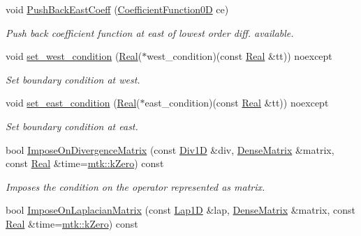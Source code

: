 \begin{DoxyCompactItemize}
void \hyperlink{classmtk_1_1RobinBCDescriptor1D_a7791c11e0950656cb5608a77918c28d4}{Push\+Back\+East\+Coeff} (\hyperlink{group__c07-mim__ops_ga04276745b4d511f0f3c636d6e0df7c2d}{Coefficient\+Function0\+D} ce)
\begin{DoxyCompactList}\small\item\em Push back coefficient function at east of lowest order diff. available. \end{DoxyCompactList}\item 
void \hyperlink{classmtk_1_1RobinBCDescriptor1D_a06bfaf0126d528247c3c76fdd19f4b85}{set\+\_\+west\+\_\+condition} (\hyperlink{group__c01-roots_gac080bbbf5cbb5502c9f00405f894857d}{Real}($\ast$west\+\_\+condition)(const \hyperlink{group__c01-roots_gac080bbbf5cbb5502c9f00405f894857d}{Real} \&tt)) noexcept
\begin{DoxyCompactList}\small\item\em Set boundary condition at west. \end{DoxyCompactList}\item 
void \hyperlink{classmtk_1_1RobinBCDescriptor1D_a4edc92eeaaaa3f1e7f2cedfea3d35681}{set\+\_\+east\+\_\+condition} (\hyperlink{group__c01-roots_gac080bbbf5cbb5502c9f00405f894857d}{Real}($\ast$east\+\_\+condition)(const \hyperlink{group__c01-roots_gac080bbbf5cbb5502c9f00405f894857d}{Real} \&tt)) noexcept
\begin{DoxyCompactList}\small\item\em Set boundary condition at east. \end{DoxyCompactList}\item 
bool \hyperlink{classmtk_1_1RobinBCDescriptor1D_a09b026a79dde6e8dc14e981a45320863}{Impose\+On\+Divergence\+Matrix} (const \hyperlink{classmtk_1_1Div1D}{Div1\+D} \&div, \hyperlink{classmtk_1_1DenseMatrix}{Dense\+Matrix} \&matrix, const \hyperlink{group__c01-roots_gac080bbbf5cbb5502c9f00405f894857d}{Real} \&time=\hyperlink{group__c01-roots_ga59a451a5fae30d59649bcda274fea271}{mtk\+::k\+Zero}) const 
\begin{DoxyCompactList}\small\item\em Imposes the condition on the operator represented as matrix. \end{DoxyCompactList}\item 
bool \hyperlink{classmtk_1_1RobinBCDescriptor1D_ab8446428df923c27f388a85bd3f2c6d4}{Impose\+On\+Laplacian\+Matrix} (const \hyperlink{classmtk_1_1Lap1D}{Lap1\+D} \&lap, \hyperlink{classmtk_1_1DenseMatrix}{Dense\+Matrix} \&matrix, const \hyperlink{group__c01-roots_gac080bbbf5cbb5502c9f00405f894857d}{Real} \&time=\hyperlink{group__c01-roots_ga59a451a5fae30d59649bcda274fea271}{mtk\+::k\+Zero}) const 

\end{DoxyCompactItemize}
